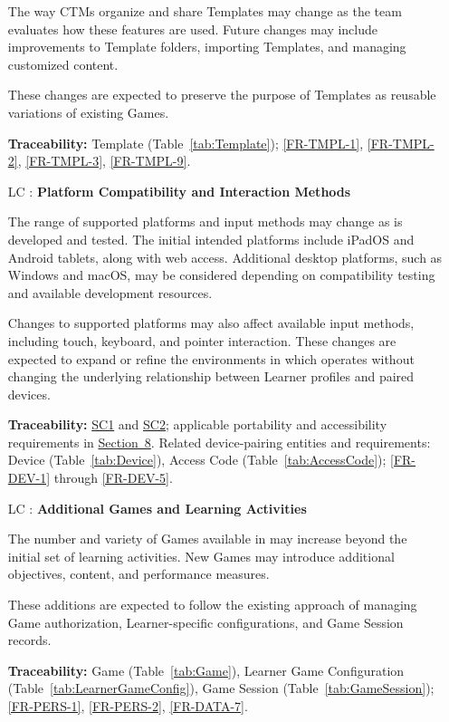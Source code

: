 \documentclass[12pt]{article}
\newcounter{lcnum} %
\begin{document}
\begin{itemize}
The way CTMs organize and share Templates may change as the team evaluates how
these features are used. Future changes may include improvements to Template
folders, importing Templates, and managing customized content.

These changes are expected to preserve the purpose of Templates as reusable
variations of existing Games.

\textbf{Traceability:} Template (Table~\ref{tab:Template}); \ref{FR-TMPL-1},
\ref{FR-TMPL-2}, \ref{FR-TMPL-3}, \ref{FR-TMPL-9}.

\item[LC\refstepcounter{lcnum}\thelcnum
  \label{LC_PlatformCompatibility}:] \textbf{Platform Compatibility and
Interaction Methods}

The range of supported platforms and input methods may change as \progname{} is
developed and tested. The initial intended platforms include iPadOS and Android
tablets, along with web access. Additional desktop platforms, such as Windows
and macOS, may be considered depending on compatibility testing and available
development resources.

Changes to supported platforms may also affect available input methods,
including touch, keyboard, and pointer interaction. These changes are expected
to expand or refine the environments in which \progname{} operates without
changing the underlying relationship between Learner profiles and paired
devices.

\textbf{Traceability:} \hyperlink{subsection.2.5}{SC1} and \hyperlink{subsection.2.5}{SC2};
applicable portability and accessibility requirements in
\hyperlink{section.8}{Section~8}. Related device-pairing entities and
requirements: Device (Table~\ref{tab:Device}), Access Code
(Table~\ref{tab:AccessCode}); \ref{FR-DEV-1} through \ref{FR-DEV-5}.

\item[LC\refstepcounter{lcnum}\thelcnum
  \label{LC_AdditionalGames}:] \textbf{Additional Games and Learning Activities}

The number and variety of Games available in \progname{} may increase beyond the
initial set of learning activities. New Games may introduce additional
objectives, content, and performance measures.

These additions are expected to follow the existing approach of managing Game
authorization, Learner-specific configurations, and Game Session records.

\textbf{Traceability:} Game (Table~\ref{tab:Game}), Learner Game Configuration
(Table~\ref{tab:LearnerGameConfig}), Game Session (Table~\ref{tab:GameSession});
\ref{FR-PERS-1}, \ref{FR-PERS-2}, \ref{FR-DATA-7}.

\end{itemize}
\end{document}
